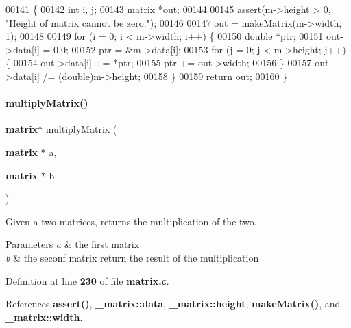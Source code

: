 \begin{DoxyCode}
00141                               \{
00142   \textcolor{keywordtype}{int} i, j;
00143   matrix *out;
00144 
00145   assert(m->height > 0, \textcolor{stringliteral}{"Height of matrix cannot be zero."});
00146 
00147   out = makeMatrix(m->width, 1);
00148 
00149   \textcolor{keywordflow}{for} (i = 0; i < m->width; i++) \{
00150     \textcolor{keywordtype}{double} *ptr;
00151     out->data[i] = 0.0;
00152     ptr = &m->data[i];
00153     \textcolor{keywordflow}{for} (j = 0; j < m->height; j++) \{
00154       out->data[i] += *ptr;
00155       ptr += out->width;
00156     \}
00157     out->data[i] /= (double)m->height;
00158   \}
00159   \textcolor{keywordflow}{return} out;
00160 \}
\end{DoxyCode}
\mbox{\label{a00041_a63ed5c518b34768e9ef8e9d5f7d0b534}} 
\paragraph{multiply\+Matrix()}
{\footnotesize\ttfamily \textbf{ matrix}$\ast$ multiply\+Matrix (\begin{DoxyParamCaption}\item[{\textbf{ matrix} $\ast$}]{a,  }\item[{\textbf{ matrix} $\ast$}]{b }\end{DoxyParamCaption})}



Given a two matrices, returns the multiplication of the two. 


\begin{DoxyParams}{Parameters}
{\em a} & the first matrix \\
\hline
{\em b} & the seconf matrix return the result of the multiplication \\
\hline
\end{DoxyParams}


Definition at line \textbf{ 230} of file \textbf{ matrix.\+c}.



References \textbf{ assert()}, \textbf{ \+\_\+matrix\+::data}, \textbf{ \+\_\+matrix\+::height}, \textbf{ make\+Matrix()}, and \textbf{ \+\_\+matrix\+::width}.


